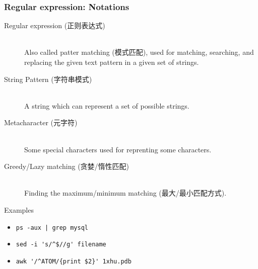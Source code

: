 \documentclass[red]{beamer}
\begin{document}
\begin{CJK*}{UTF8}{gbsn}
\begin{frame}[containsverbatim]
\frametitle{Regular expression: Notations}
\footnotesize
\begin{description}
	\item[Regular expression (正则表达式)]\hfill \\
		Also called patter matching (模式匹配), used for matching, searching, 
		and replacing the given text pattern in a given set of strings.
	\item[String Pattern (字符串模式)] \hfill \\
		A string which can represent a set of possible strings.
	\item[Metacharacter (元字符)] \hfill \\
		Some special characters used for reprenting some characters.
	\item[Greedy/Lazy matching (贪婪/惰性匹配)] \hfill \\
		Finding the maximum/minimum matching (最大/最小匹配方式).
\end{description}
\centering
\begin{block}{Examples}
\begin{itemize}
	\item \lstinline{ps -aux | grep mysql}
	\item \lstinline{sed -i 's/^$//g' filename}
	\item \lstinline|awk '/^ATOM/{print $2}' 1xhu.pdb|
\end{itemize}
\end{block}
\end{frame}


\end{CJK*}
\end{document}
